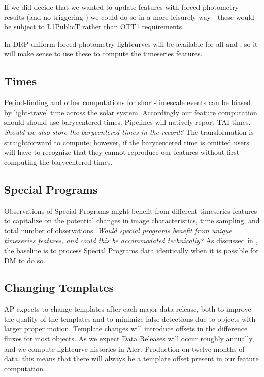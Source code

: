 \documentclass[DM,authoryear,toc]{lsstdoc}
\begin{document}
If we did decide that we wanted to update \DIAObject features with forced photometry results (and no triggering \DIASource) we could do so in a more leisurely way---these would be subject to L1PublicT rather than OTT1 requirements.

In DRP uniform forced photometry lightcurves will be available for all \Objects and \DIAObjects, so it will make sense to use these to compute the timeseries features.

\subsection{Times}

Period-finding and other computations for short-timescale events can be biased by light-travel time across the solar system.
Accordingly our feature computation should should use barycentered times.  
Pipelines will natively report TAI times.
\textit{Should we also store the barycentered times in the \DIASource record?}
The transformation is straightforward to compute; however, if the barycentered time is omitted users will have to recognize that they cannot reproduce our features without first computing the barycentered times.

\subsection{Special Programs}

Observations of Special Programs might benefit from different timeseries features to capitalize on the potential changes in image characteristics, time sampling, and total number of observations.
\textit{Would special programs benefit from unique timeseries features, and could this be accommodated technically?}
As discussed in , the baseline is to process Special Programs data identically when it is possible for DM to do so. 


\subsection{Changing Templates} \label{sec:template_change}

AP expects to change templates after each major data release, both to improve the quality of the templates and to minimize false detections due to objects with larger proper motion.
Template changes will introduce offsets in the difference fluxes for most objects.
As we expect Data Releases will occur roughly annually, and we compute lightcurve histories in Alert Production on twelve months of data, this means that there will always be a template offset present in our feature computation.
\end{document}

